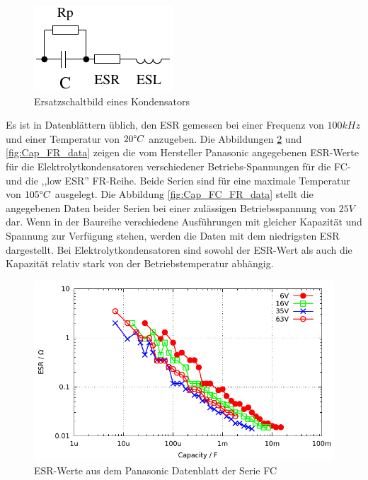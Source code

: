 \begin{figure}[H]
  \centering
    \includegraphics[]{../FIG/Cap_equiv.pdf}
  \caption{Ersatzschaltbild eines Kondensators}
  \label{fig:Cap_equiv}
\end{figure}

Es ist in Datenblättern üblich, den ESR gemessen bei einer Frequenz von \(100kHz\) und
einer Temperatur von \(20{\degree}C\) anzugeben.
Die Abbildungen \ref{fig:Cap_FC_data} und \ref{fig:Cap_FR_data} zeigen die vom Hersteller Panasonic 
angegebenen ESR-Werte für die Elektrolytkondensatoren verschiedener Betriebs-Spannungen für die FC- und die ,,low ESR'' FR-Reihe.
Beide Serien sind für eine maximale Temperatur von \(105{\degree}C\) ausgelegt.
Die Abbildung \ref{fig:Cap_FC_FR_data} stellt die angegebenen Daten beider Serien bei einer zulässigen Betriebsspannung
von \(25V\) dar. Wenn in der Baureihe verschiedene Ausführungen mit gleicher Kapazität und Spannung zur Verfügung stehen,
werden die Daten mit dem niedrigsten ESR dargestellt.
Bei Elektrolytkondensatoren sind sowohl der ESR-Wert als auch die Kapazität relativ stark von der Betriebstemperatur
abhängig.

\begin{figure}[H]
  \centering
    \includegraphics[width=14cm]{../GNU/Cap_FC_data.pdf}
  \caption{ESR-Werte aus dem Panasonic Datenblatt der Serie FC}
  \label{fig:Cap_FC_data}
\end{figure}

